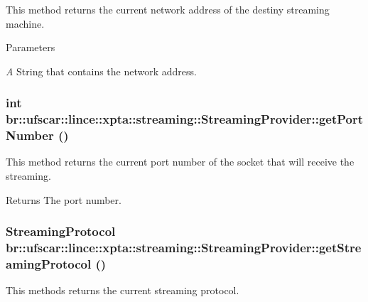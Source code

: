 This method returns the current network address of the destiny streaming machine. 


\begin{DoxyParams}{Parameters}
\item[{\em A}]String that contains the network address. \end{DoxyParams}
\hypertarget{classbr_1_1ufscar_1_1lince_1_1xpta_1_1streaming_1_1StreamingProvider_ac909e10bd3de4a717302b52bf28e47ca}{
\subsubsection[{getPortNumber}]{\setlength{\rightskip}{0pt plus 5cm}int br::ufscar::lince::xpta::streaming::StreamingProvider::getPortNumber ()}}
\label{classbr_1_1ufscar_1_1lince_1_1xpta_1_1streaming_1_1StreamingProvider_ac909e10bd3de4a717302b52bf28e47ca}


This method returns the current port number of the socket that will receive the streaming. 

\begin{DoxyReturn}{Returns}
The port number. 
\end{DoxyReturn}
\hypertarget{classbr_1_1ufscar_1_1lince_1_1xpta_1_1streaming_1_1StreamingProvider_a733b72dcdd112eec46b4c516c13bfef6}{
\subsubsection[{getStreamingProtocol}]{\setlength{\rightskip}{0pt plus 5cm}StreamingProtocol br::ufscar::lince::xpta::streaming::StreamingProvider::getStreamingProtocol ()}}
\label{classbr_1_1ufscar_1_1lince_1_1xpta_1_1streaming_1_1StreamingProvider_a733b72dcdd112eec46b4c516c13bfef6}


This methods returns the current streaming protocol. 

